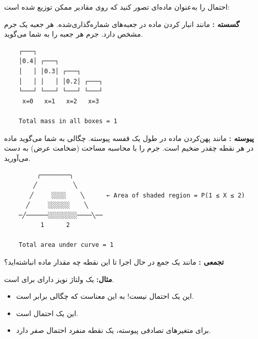 
احتمال را به‌عنوان ماده‌ای تصور کنید که روی مقادیر ممکن توزیع شده است:

\textbf{گسسته :} مانند انبار کردن ماده در جعبه‌های شماره‌گذاری‌شده. هر جعبه یک جرم مشخص دارد.  جرم هر جعبه را به شما می‌گوید.


\begin{PSplaincode}
\begin{Verbatim}
    ┌───┐
    │0.4│ ┌───┐
    │   │ │0.3│ ┌───┐
    │   │ │   │ │0.2│ ┌───┐
    └───┘ └───┘ └───┘ └───┘
     x=0   x=1   x=2   x=3
     
    Total mass in all boxes = 1
\end{Verbatim}
\end{PSplaincode}

\textbf{پیوسته :} مانند پهن‌کردن ماده در طول یک قفسه پیوسته. چگالی به شما می‌گوید ماده در هر نقطه چقدر ضخیم است. جرم را با محاسبه مساحت (ضخامت \lr{\ensuremath{\times}} عرض) به دست می‌آورید.


\begin{PSplaincode}
\begin{Verbatim}
         ╭────────╮
        ╱          ╲
       ╱     ░░░░    ╲      ← Area of shaded region = P(1 ≤ X ≤ 2)
      ╱     ░░░░░░    ╲
    ─╱──────░░░░░░░░────╲──
          1      2

    Total area under curve = 1
\end{Verbatim}
\end{PSplaincode}

\textbf{تجمعی :} مانند یک جمع در حال اجرا  تا این نقطه چه مقدار ماده انباشته‌اید؟


\textbf{مثال:} یک ولتاژ نویز  دارای  برای  است.

\begin{itemize}
\tightlist
\item
   این یک احتمال نیست! به این معناست که چگالی برابر  است.
\item
   این یک احتمال است.
\item
   برای متغیرهای تصادفی پیوسته، یک نقطه منفرد احتمال صفر دارد.
\end{itemize}

